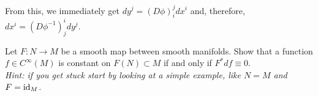 \begin{example}
  From this, we immediately get $dy^j = (D\phi)_i^j dx^i$ and, therefore, $dx^i =  (D\phi^{-1})_j^i dy^j$.
\end{example}

\begin{exercise}
  Let $F:N\to M$ be a smooth map between smooth manifolds.
  Show that a function $f\in C^\infty(M)$ is constant on $F(N)\subset M$ if and only if $F^* df \equiv 0$.\\
  \textit{\small Hint: if you get stuck start by looking at a simple example, like $N=M$ and $F=\operatorname{id}_M$.}
\end{exercise}
